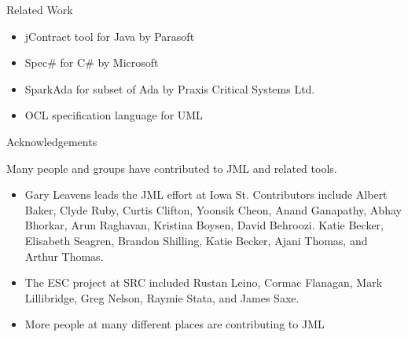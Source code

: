 \documentclass[
pdf,
nocolorBG,
slideColor,
erik,
]{prosper}
\begin{document}
\begin{slide}{Related Work}
\vspace*{-4ex}

\begin{itemize}
\item {\blue jContract} tool for Java by {\green Parasoft}
\item {\blue Spec\#} for {\green C\#} by {\green Microsoft}
\item {\blue SparkAda} for subset of Ada by {\green Praxis Critical Systems Ltd.}
\item {\blue OCL} specification language for {\green UML}
\end{itemize}
\end{slide}


\begin{slide}{Acknowledgements}

\vspace*{-4ex}
Many people and groups have contributed to JML and related tools.

\begin{itemize}
\item {\scriptsize Gary Leavens leads the JML effort at Iowa St. 
    Contributors include Albert Baker, Clyde Ruby, Curtis
    Clifton, Yoonsik Cheon, Anand Ganapathy, Abhay Bhorkar, Arun
    Raghavan, Kristina Boysen, David Behroozi. Katie Becker, Elisabeth
    Seagren, Brandon Shilling, Katie Becker, Ajani Thomas, and Arthur
    Thomas.}
\item {\scriptsize The ESC project at SRC included Rustan 
    Leino, Cormac Flanagan, Mark Lillibridge, Greg Nelson, Raymie
    Stata, and James Saxe.}
\item {\scriptsize More people at many different places are contributing to JML}
\end{itemize}
  
\end{slide}
\end{document}
